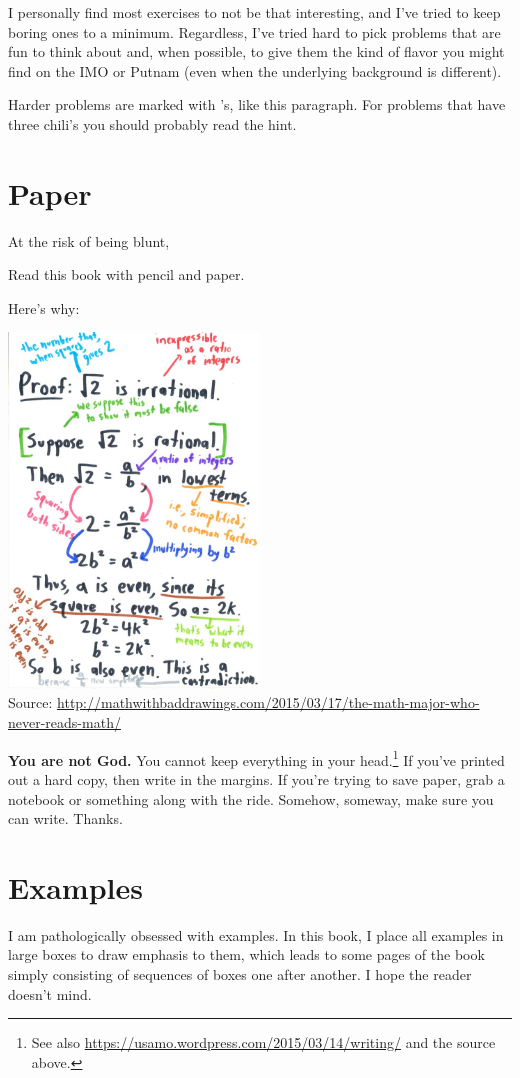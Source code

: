 I personally find most exercises to not be that interesting, and I've tried to keep boring ones to a minimum.
Regardless, I've tried hard to pick problems that are fun to think about and, when possible, to give them
the kind of flavor you might find on the IMO or Putnam (even when the underlying background is different).

\gim
Harder problems are marked with \chili's, like this paragraph.
For problems that have three chili's you should probably read the hint.

\section{Paper}
At the risk of being blunt,
\begin{moral}
Read this book with pencil and paper.
\end{moral}
Here's why:

\begin{center}
	\includegraphics[width=0.5\textwidth]{media/read-with-pencil.jpg} \\
	{\footnotesize Source: \url{http://mathwithbaddrawings.com/2015/03/17/the-math-major-who-never-reads-math/}}
\end{center}
\textbf{You are not God.}
You cannot keep everything in your head.\footnote{
	See also \url{https://usamo.wordpress.com/2015/03/14/writing/} and the source above.
}
If you've printed out a hard copy, then write in the margins.
If you're trying to save paper, grab a notebook or something along with the ride.
Somehow, someway, make sure you can write. Thanks.


\section{Examples}
I am pathologically obsessed with examples.
In this book, I place all examples in large boxes to draw emphasis to them, which leads to some pages of the book simply consisting of sequences of boxes one after another. I hope the reader doesn't mind.

